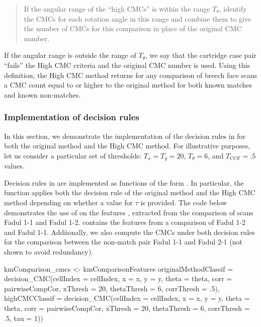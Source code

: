 \begin{quote}
If the angular range of the ``high CMCs'' is within the range
\(T_\theta\), identify the CMCs for each rotation angle in this range
and combine them to give the number of CMCs for this comparison in place
of the original CMC number.
\end{quote}

If the angular range is outside the range of \(T_\theta\), we say that
the cartridge case pair ``fails'' the High CMC criteria and the original
CMC number is used. Using this definition, the High CMC method returns
for any comparison of breech face scans a CMC count equal to or higher
to the original method for both known matches and known non-matches.

\hypertarget{decisionRuleImplementation}{%
\subsubsection{Implementation of decision
rules}\label{decisionRuleImplementation}}

In this section, we demonstrate the implementation of the decision rules
in  for both the original method and the High CMC method.
For illustrative purposes, let us consider a particular set of
thresholds: \(T_x = T_y = 20\), \(T_{\theta} = 6\), and
\(T_{\text{CCF}} = .5\) values.

Decision rules in  are implemented as functions of the
form . In particular, the 
function applies both the decision rule of the original method and the
High CMC method depending on whether a value for \(\tau\) is provided.
The code below demonstrates the use of  on the
features , extracted from the comparison of
scans Fadul 1-1 and Fadul 1-2.  contains
the features from a comparison of Fadul 1-2 and Fadul 1-1. Addiionally,
we also compute the CMCs under both decision rules for the comparison
between the non-match pair Fadul 1-1 and Fadul 2-1 (not shown to avoid
redundancy).

\begin{Schunk}
\begin{Sinput}
kmComparison_cmcs <- kmComparisonFeatures %
  originalMethodClassif =
    decision_CMC(cellIndex = cellIndex, x = x, y = y, theta = theta,
                 corr = pairwiseCompCor, xThresh = 20, thetaThresh = 6,
                 corrThresh = .5),
  highCMCClassif =
    decision_CMC(cellIndex = cellIndex, x = x, y = y, theta = theta,
                 corr = pairwiseCompCor, xThresh = 20, thetaThresh = 6,
                 corrThresh = .5, tau = 1))
\end{Sinput}
\end{Schunk}

